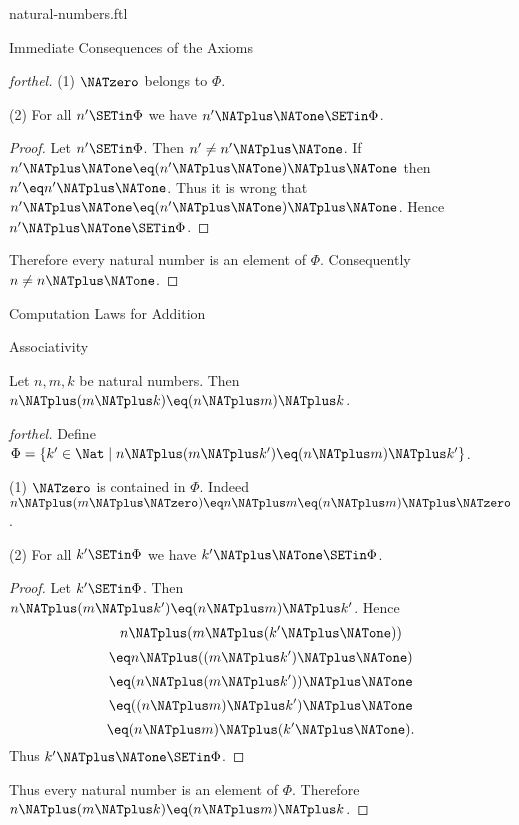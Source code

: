 \documentclass{naproche-library}
\begin{document}
\begin{smodule}[title=Natural Numbers]{natural-numbers.ftl}
\begin{sfragment}{Immediate Consequences of the Axioms}
\begin{proof}[forthel]
    (1) $\NATzero$ belongs to $\Phi$.

    (2) For all $n' \SETin \Phi$ we have $n' \NATplus \NATone \SETin \Phi$.
    \begin{proof}
      Let $n' \SETin \Phi$.
      Then $n' \neq n' \NATplus \NATone$.
      If $n' \NATplus \NATone \eq (n' \NATplus \NATone) \NATplus \NATone$ then $n' \eq n' \NATplus \NATone$.
      Thus it is wrong that $n' \NATplus \NATone \eq (n' \NATplus \NATone) \NATplus \NATone$.
      Hence $n' \NATplus \NATone \SETin \Phi$.
    \end{proof}

    Therefore every natural number is an element of $\Phi$.
    Consequently $n \neq n \NATplus \NATone$.
  \end{proof}
\end{sfragment}

\begin{sfragment}{Computation Laws for Addition}
  \begin{sfragment}{Associativity}
    \begin{proposition}[forthel,id=ARITHMETIC_03_3235893452210176]
      Let $n, m, k$ be natural numbers.
      Then $n \NATplus (m \NATplus k) \eq (n \NATplus m) \NATplus k$.
    \end{proposition}
    \begin{proof}[forthel]
      Define $\Phi = \{ k' \in \Nat \mid n \NATplus (m \NATplus k') \eq (n \NATplus m) \NATplus k' \}$.

      (1) $\NATzero$ is contained in $\Phi$.
      Indeed $n \NATplus (m \NATplus \NATzero) \eq n \NATplus m \eq (n \NATplus m) \NATplus \NATzero$.

      (2) For all $k' \SETin \Phi$ we have $k' \NATplus \NATone \SETin \Phi$.
      \begin{proof}
        Let $k' \SETin \Phi$.
        Then $n \NATplus (m \NATplus k') \eq (n \NATplus m) \NATplus k'$.
        Hence
        \[  n \NATplus (m \NATplus (k' \NATplus \NATone))        \]
        \[    \eq n \NATplus ((m \NATplus k') \NATplus \NATone)    \]
        \[    \eq (n \NATplus (m \NATplus k')) \NATplus \NATone    \]
        \[    \eq ((n \NATplus m) \NATplus k') \NATplus \NATone    \]
        \[    \eq (n \NATplus m) \NATplus (k' \NATplus \NATone).   \]
        Thus $k' \NATplus \NATone \SETin \Phi$.
      \end{proof}

      Thus every natural number is an element of $\Phi$.
      Therefore $n \NATplus (m \NATplus k) \eq (n \NATplus m) \NATplus k$.
    \end{proof}
  \end{sfragment}


\end{sfragment}
\end{smodule}
\end{document}
